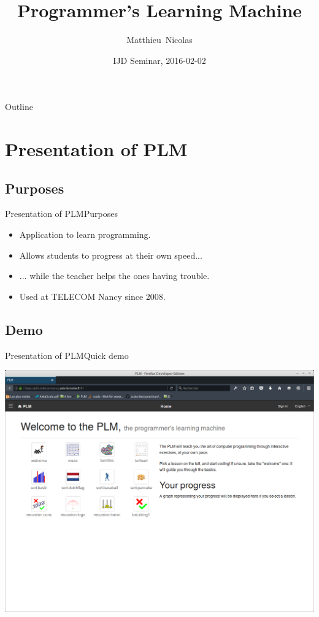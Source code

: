 \documentclass{beamer}
\title{Programmer's Learning Machine}
\subtitle{}
\author{Matthieu~Nicolas}
\date{IJD Seminar, 2016-02-02}
\begin{document}
\begin{frame}
  \titlepage
\end{frame}

\begin{frame}{Outline}
  \tableofcontents
\end{frame}

\section{Presentation of PLM}

\subsection{Purposes}

\begin{frame}{Presentation of PLM}{Purposes}
  \begin{itemize}
  \item {
    Application to learn programming.
    \pause
  }
  \item {
    Allows students to progress at their own speed...
    \pause
  }
  \item {
    ... while the teacher helps the ones having trouble.
    \pause
  }
  \item {
    Used at TELECOM Nancy since 2008.
  }
  \end{itemize}
\end{frame}

\subsection{Demo}

\begin{frame}{Presentation of PLM}{Quick demo}
  \begin{center}
    \href{https://plm.telecomnancy.univ-lorraine.fr}{\includegraphics[scale=0.20]{img/screen-webPLM-1.png}}
  \end{center}
\end{frame}
\end{document}
